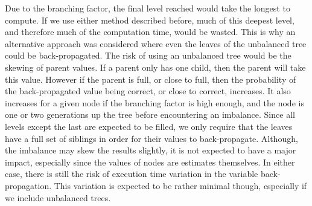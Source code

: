 \documentclass[]{article}
\begin{document}
Due to the branching factor, the final level reached would take the longest to compute. If we use either method described before, much of this deepest level, and therefore much of the computation time, would be wasted. This is why an alternative approach was considered where even the leaves of the unbalanced tree could be back-propagated. The risk of using an unbalanced tree would be the skewing of parent values. If a parent only has one child, then the parent will take this value. However if the parent is full, or close to full, then the probability of the back-propagated value being correct, or close to correct, increases. It also increases for a given node if the branching factor is high enough, and the node is one or two generations up the tree before encountering an imbalance. Since all levels except the last are expected to be filled, we only require that the leaves have a full set of siblings in order for their values to back-propagate. Although, the imbalance may skew the results slightly, it is not expected to have a major impact, especially since the values of nodes are estimates themselves. %
In either case, there is still the risk of execution time variation in the variable back-propagation. This variation is expected to be rather minimal though, especially if we include unbalanced trees.

\end{document}
